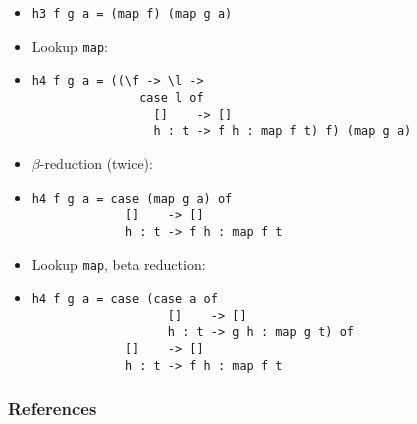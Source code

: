 \documentclass{beamer}
\begin{document}
\begin{frame}[fragile]

    \begin{itemize}

        \item[]
            \begin{verbatim}
h3 f g a = (map f) (map g a)
            \end{verbatim}

        \item[] Lookup \texttt{map}:

        \item[]
            \begin{verbatim}
h4 f g a = ((\f -> \l ->
               case l of
                 []    -> []
                 h : t -> f h : map f t) f) (map g a)
              \end{verbatim}

          \item[] $\beta$-reduction (twice):

          \item[]
              \begin{verbatim}
h4 f g a = case (map g a) of
             []    -> []
             h : t -> f h : map f t
              \end{verbatim}

          \item[] Lookup \texttt{map}, beta reduction:

          \item[]
              \begin{verbatim}
h4 f g a = case (case a of
                   []    -> []
                   h : t -> g h : map g t) of
             []    -> []
             h : t -> f h : map f t
              \end{verbatim}

    \end{itemize}

\end{frame}

\begin{frame}[allowframebreaks]
    \frametitle{References}

    
    
\end{frame}
\end{document}
